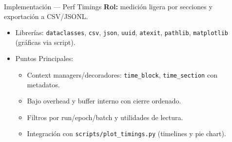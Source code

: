 \begin{frame}{Implementación — Perf Timings}
    \textbf{Rol:} medición ligera por secciones y exportación a CSV/JSONL.
    \vspace{0.2cm}
    \begin{itemize}
        \item Librerías: \texttt{dataclasses}, \texttt{csv}, \texttt{json}, \texttt{uuid}, \texttt{atexit}, \texttt{pathlib}, \texttt{matplotlib} (gráficas via script).
        \item Puntos Principales:
        \begin{itemize}
            \item Context managers/decoradores: \texttt{time\_block}, \texttt{time\_section} con metadatos.
            \item Bajo overhead y buffer interno con cierre ordenado.
            \item Filtros por run/epoch/batch y utilidades de lectura.
            \item Integración con \texttt{scripts/plot\_timings.py} (timelines y pie chart).
        \end{itemize}
    \end{itemize}
\end{frame}

